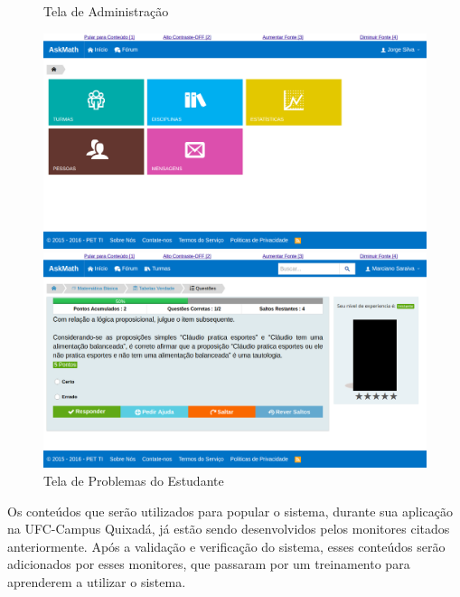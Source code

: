 \begin{figure}[h!]
  \begin{minipage}[b]{0.49\textwidth}
    \caption{Tela de Administra\c{c}\~ao}
    \includegraphics[width=\textwidth]{figuras/askmath/3}
  \end{minipage}
  \hfill
  \begin{minipage}[b]{0.49\textwidth}
	\caption{Tela de Problemas do Estudante}
    \includegraphics[width=\textwidth]{figuras/askmath/4}
  \end{minipage}
\end{figure}

Os conteúdos que serão utilizados para popular o sistema, durante sua aplicação na UFC-Campus Quixadá, já estão sendo desenvolvidos pelos monitores citados anteriormente. Após a validação e verificação do sistema, esses conteúdos serão adicionados por esses monitores, que passaram por um treinamento para aprenderem a utilizar o sistema.

